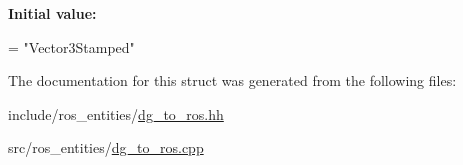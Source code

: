 {\bfseries Initial value\+:}
\begin{DoxyCode}
=
    \textcolor{stringliteral}{"Vector3Stamped"}
\end{DoxyCode}


The documentation for this struct was generated from the following files\+:\begin{DoxyCompactItemize}
\item 
include/ros\+\_\+entities/\hyperlink{dg__to__ros_8hh}{dg\+\_\+to\+\_\+ros.\+hh}\item 
src/ros\+\_\+entities/\hyperlink{dg__to__ros_8cpp}{dg\+\_\+to\+\_\+ros.\+cpp}\end{DoxyCompactItemize}
